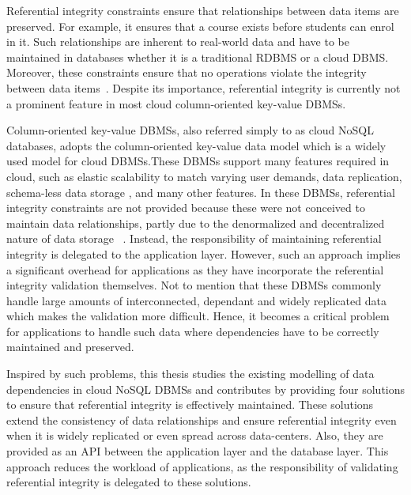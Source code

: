 Referential integrity constraints  ensure that  relationships between data items
are preserved. For example, it ensures that a course exists before students can
enrol in it. Such relationships are inherent to real-world data and have to be
maintained in databases whether it is a traditional \ac{RDBMS} or a cloud
\ac{DBMS}. Moreover, these constraints  ensure that no operations violate  the
integrity between  data items~\citep{Navathe}.   Despite its importance,
referential integrity is currently not a prominent feature in most  cloud
column-oriented key-value \acp{DBMS}.
   
   
Column-oriented key-value \acp{DBMS}, also  referred simply to as cloud
\ac{NoSQL} databases,  adopts the column-oriented key-value data model which is
a widely used model for cloud \acp{DBMS}.These \acp{DBMS}  support many features
required in cloud,  such as elastic scalability to match varying user demands,
data replication,  schema-less data storage ,   and many other features. In
these \acp{DBMS},  referential integrity constraints are not provided because
these were not conceived to maintain data relationships, partly due to the
denormalized and decentralized nature of data storage ~\citep{Navathe}.
Instead, the responsibility of maintaining referential integrity is delegated to
the application layer. However, such an approach implies a significant overhead
for applications as they have incorporate the referential integrity validation
themselves. Not to mention that these \acp{DBMS} commonly handle large amounts
of interconnected, dependant and widely replicated data which makes the
validation more difficult. Hence, it becomes a  critical problem for
applications to handle such  data where dependencies have to be correctly
maintained and preserved.
   
   
Inspired by such problems, this thesis studies the existing modelling of data
dependencies in cloud \ac{NoSQL}  \acp{DBMS}  and contributes by providing four
solutions to ensure  that referential integrity is effectively maintained. These
solutions  extend the consistency of data relationships and  ensure  referential
integrity even when it is widely replicated or even spread across data-centers.
Also, they are provided as an \ac{API} between the application layer and the
database layer. This approach reduces the workload of applications, as the
responsibility of validating referential integrity is delegated to these
solutions.
   

